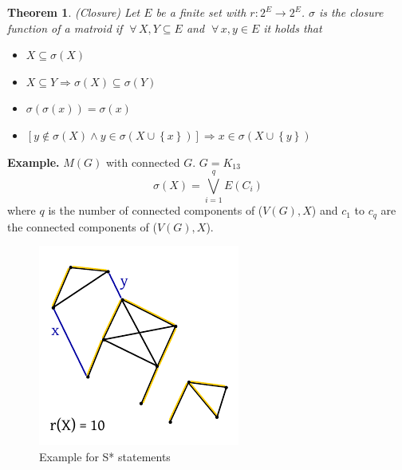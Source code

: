 \documentclass{article}
\newtheorem{theorem}{Theorem}
\newcommand{\set}[1]{\left\{#1\right\}}
\newcommand{\fall}{\;\forall\,}
\begin{document}
\begin{theorem}
  \label{satz-8.7}
  (Closure)
  Let $E$ be a finite set with $r: 2^E \rightarrow 2^E$.
  $\sigma$ is the closure function of a matroid if $\fall X, Y \subseteq E$ and $\fall x, y \in E$ it holds that
  \begin{itemize}
    \item[(S1)] $X \subseteq \sigma(X)$
    \item[(S2)] $X \subseteq Y \Rightarrow \sigma(X) \subseteq \sigma(Y)$
    \item[(S3)] $\sigma(\sigma(x)) = \sigma(x)$
    \item[(S4)] $[y \notin \sigma(X) \land y \in \sigma(X \cup \set{x})] \Rightarrow x \in \sigma(X \cup \set{y})$
  \end{itemize}
\end{theorem}

\textbf{Example.}
  $M(G)$ with connected $G$. $G = K_{13}$
  \[ \sigma(X) = \bigvee_{i=1}^q E(C_i) \]
  where $q$ is the number of connected components of ($V(G), X$) and $c_{1}$ to $c_{q}$ are the connected components of ($V(G), X$).

\begin{figure}[!ht]
  \begin{center}
    \includegraphics{img/s_statements_example.pdf}
    \caption{Example for S* statements}
  \end{center}
\end{figure}
\end{document}
